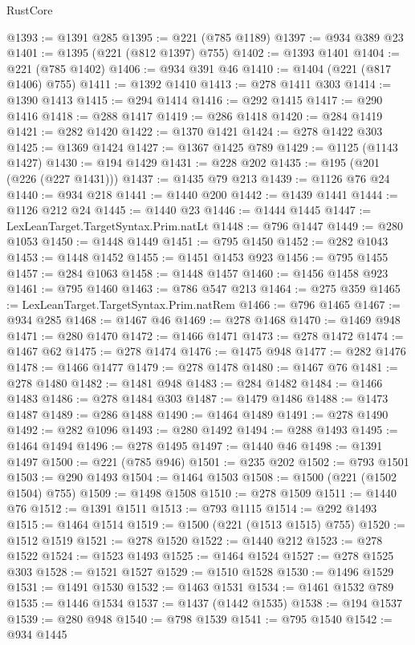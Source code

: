 \begin{lexlean}{RustCore}
\begin{coremodule}
@1393 := @1391 @285
@1395 := @221 (@785 @1189)
@1397 := @934 @389 @23
@1401 := @1395 (@221 (@812 @1397) @755)
@1402 := @1393 @1401
@1404 := @221 (@785 @1402)
@1406 := @934 @391 @46
@1410 := @1404 (@221 (@817 @1406) @755)
@1411 := @1392 @1410
@1413 := @278 @1411 @303
@1414 := @1390 @1413
@1415 := @294 @1414
@1416 := @292 @1415
@1417 := @290 @1416
@1418 := @288 @1417
@1419 := @286 @1418
@1420 := @284 @1419
@1421 := @282 @1420
@1422 := @1370 @1421
@1424 := @278 @1422 @303
@1425 := @1369 @1424
@1427 := @1367 @1425 @789
@1429 := @1125 (@1143 @1427)
@1430 := @194 @1429
@1431 := @228 @202
@1435 := @195 (@201 (@226 (@227 @1431)))
@1437 := @1435 @79 @213
@1439 := @1126 @76 @24
@1440 := @934 @218
@1441 := @1440 @200
@1442 := @1439 @1441
@1444 := @1126 @212 @24
@1445 := @1440 @23
@1446 := @1444 @1445
@1447 := LexLeanTarget.TargetSyntax.Prim.natLt
@1448 := @796 @1447
@1449 := @280 @1053
@1450 := @1448 @1449
@1451 := @795 @1450
@1452 := @282 @1043
@1453 := @1448 @1452
@1455 := @1451 @1453 @923
@1456 := @795 @1455
@1457 := @284 @1063
@1458 := @1448 @1457
@1460 := @1456 @1458 @923
@1461 := @795 @1460
@1463 := @786 @547 @213
@1464 := @275 @359
@1465 := LexLeanTarget.TargetSyntax.Prim.natRem
@1466 := @796 @1465
@1467 := @934 @285
@1468 := @1467 @46
@1469 := @278 @1468
@1470 := @1469 @948
@1471 := @280 @1470
@1472 := @1466 @1471
@1473 := @278 @1472
@1474 := @1467 @62
@1475 := @278 @1474
@1476 := @1475 @948
@1477 := @282 @1476
@1478 := @1466 @1477
@1479 := @278 @1478
@1480 := @1467 @76
@1481 := @278 @1480
@1482 := @1481 @948
@1483 := @284 @1482
@1484 := @1466 @1483
@1486 := @278 @1484 @303
@1487 := @1479 @1486
@1488 := @1473 @1487
@1489 := @286 @1488
@1490 := @1464 @1489
@1491 := @278 @1490
@1492 := @282 @1096
@1493 := @280 @1492
@1494 := @288 @1493
@1495 := @1464 @1494
@1496 := @278 @1495
@1497 := @1440 @46
@1498 := @1391 @1497
@1500 := @221 (@785 @946)
@1501 := @235 @202
@1502 := @793 @1501
@1503 := @290 @1493
@1504 := @1464 @1503
@1508 := @1500 (@221 (@1502 @1504) @755)
@1509 := @1498 @1508
@1510 := @278 @1509
@1511 := @1440 @76
@1512 := @1391 @1511
@1513 := @793 @1115
@1514 := @292 @1493
@1515 := @1464 @1514
@1519 := @1500 (@221 (@1513 @1515) @755)
@1520 := @1512 @1519
@1521 := @278 @1520
@1522 := @1440 @212
@1523 := @278 @1522
@1524 := @1523 @1493
@1525 := @1464 @1524
@1527 := @278 @1525 @303
@1528 := @1521 @1527
@1529 := @1510 @1528
@1530 := @1496 @1529
@1531 := @1491 @1530
@1532 := @1463 @1531
@1534 := @1461 @1532 @789
@1535 := @1446 @1534
@1537 := @1437 (@1442 @1535)
@1538 := @194 @1537
@1539 := @280 @948
@1540 := @798 @1539
@1541 := @795 @1540
@1542 := @934 @1445

\end{coremodule}
\end{lexlean}
